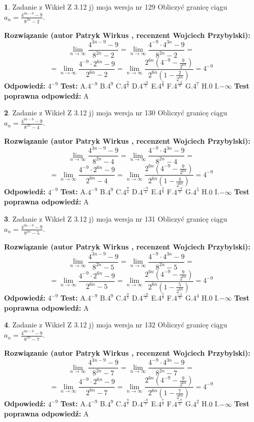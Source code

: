 \documentclass[12pt, a4paper]{article}
\theoremstyle{definition} %
\newtheorem{zad}{}
\newcommand{\zadStart}[1]{\begin{zad}#1\newline}
\newcommand{\zadStop}{\end{zad}}
\newcommand{\rozwStart}[2]{\noindent \textbf{Rozwiązanie (autor #1 , recenzent #2): }\newline}
\newcommand{\rozwStop}{\newline}
\newcommand{\odpStart}{\noindent \textbf{Odpowiedź:}\newline}
\newcommand{\odpStop}{\newline}
\newcommand{\testStart}{\noindent \textbf{Test:}\newline}
\newcommand{\testStop}{\newline}
\newcommand{\kluczStart}{\noindent \textbf{Test poprawna odpowiedź:}\newline}
\newcommand{\kluczStop}{\newline}
\begin{document}
\zadStart{Zadanie z Wikieł Z 3.12 j) moja wersja nr 129}
Obliczyć granicę ciągu $a_{n}=\frac{4^{3n-9}-9}{8^{2n}-2}$.
\zadStop
\rozwStart{Patryk Wirkus}{Wojciech Przybylski}
$$\lim\limits_{n\to\infty}\frac{4^{3n-9}-9}{8^{2n}-2}= \lim\limits_{n\to\infty}\frac{4^{-9} \cdot 4^{3n}-9}{8^{2n}-2}=$$
$$= \lim\limits_{n\to\infty}\frac{4^{-9} \cdot 2^{6n}-9}{2^{6n}-2}= \lim\limits_{n\to\infty}\frac{2^{6n}(4^{-9} - \frac{9}{2^{6n}})}{2^{6n}(1-\frac{2}{2^{6n}})}= 4^{-9}$$
\rozwStop
\odpStart
$4^{-9}$
\odpStop
\testStart
A.$4^{-9}$
B.$4^{9}$
C.$4^{\frac{9}{2}}$
D.$4^{\frac{-9}{2}}$
E.$4^{\frac{2}{9}}$
F.$4^{\frac{-2}{9}}$
G.$4^{7}$
H.$0$
I.$-\infty$
\testStop
\kluczStart
A
\kluczStop



\zadStart{Zadanie z Wikieł Z 3.12 j) moja wersja nr 130}
Obliczyć granicę ciągu $a_{n}=\frac{4^{3n-9}-9}{8^{2n}-4}$.
\zadStop
\rozwStart{Patryk Wirkus}{Wojciech Przybylski}
$$\lim\limits_{n\to\infty}\frac{4^{3n-9}-9}{8^{2n}-4}= \lim\limits_{n\to\infty}\frac{4^{-9} \cdot 4^{3n}-9}{8^{2n}-4}=$$
$$= \lim\limits_{n\to\infty}\frac{4^{-9} \cdot 2^{6n}-9}{2^{6n}-4}= \lim\limits_{n\to\infty}\frac{2^{6n}(4^{-9} - \frac{9}{2^{6n}})}{2^{6n}(1-\frac{4}{2^{6n}})}= 4^{-9}$$
\rozwStop
\odpStart
$4^{-9}$
\odpStop
\testStart
A.$4^{-9}$
B.$4^{9}$
C.$4^{\frac{9}{4}}$
D.$4^{\frac{-9}{4}}$
E.$4^{\frac{4}{9}}$
F.$4^{\frac{-4}{9}}$
G.$4^{5}$
H.$0$
I.$-\infty$
\testStop
\kluczStart
A
\kluczStop



\zadStart{Zadanie z Wikieł Z 3.12 j) moja wersja nr 131}
Obliczyć granicę ciągu $a_{n}=\frac{4^{3n-9}-9}{8^{2n}-5}$.
\zadStop
\rozwStart{Patryk Wirkus}{Wojciech Przybylski}
$$\lim\limits_{n\to\infty}\frac{4^{3n-9}-9}{8^{2n}-5}= \lim\limits_{n\to\infty}\frac{4^{-9} \cdot 4^{3n}-9}{8^{2n}-5}=$$
$$= \lim\limits_{n\to\infty}\frac{4^{-9} \cdot 2^{6n}-9}{2^{6n}-5}= \lim\limits_{n\to\infty}\frac{2^{6n}(4^{-9} - \frac{9}{2^{6n}})}{2^{6n}(1-\frac{5}{2^{6n}})}= 4^{-9}$$
\rozwStop
\odpStart
$4^{-9}$
\odpStop
\testStart
A.$4^{-9}$
B.$4^{9}$
C.$4^{\frac{9}{5}}$
D.$4^{\frac{-9}{5}}$
E.$4^{\frac{5}{9}}$
F.$4^{\frac{-5}{9}}$
G.$4^{4}$
H.$0$
I.$-\infty$
\testStop
\kluczStart
A
\kluczStop



\zadStart{Zadanie z Wikieł Z 3.12 j) moja wersja nr 132}
Obliczyć granicę ciągu $a_{n}=\frac{4^{3n-9}-9}{8^{2n}-7}$.
\zadStop
\rozwStart{Patryk Wirkus}{Wojciech Przybylski}
$$\lim\limits_{n\to\infty}\frac{4^{3n-9}-9}{8^{2n}-7}= \lim\limits_{n\to\infty}\frac{4^{-9} \cdot 4^{3n}-9}{8^{2n}-7}=$$
$$= \lim\limits_{n\to\infty}\frac{4^{-9} \cdot 2^{6n}-9}{2^{6n}-7}= \lim\limits_{n\to\infty}\frac{2^{6n}(4^{-9} - \frac{9}{2^{6n}})}{2^{6n}(1-\frac{7}{2^{6n}})}= 4^{-9}$$
\rozwStop
\odpStart
$4^{-9}$
\odpStop
\testStart
A.$4^{-9}$
B.$4^{9}$
C.$4^{\frac{9}{7}}$
D.$4^{\frac{-9}{7}}$
E.$4^{\frac{7}{9}}$
F.$4^{\frac{-7}{9}}$
G.$4^{2}$
H.$0$
I.$-\infty$
\testStop
\kluczStart
A
\kluczStop
\end{document}
